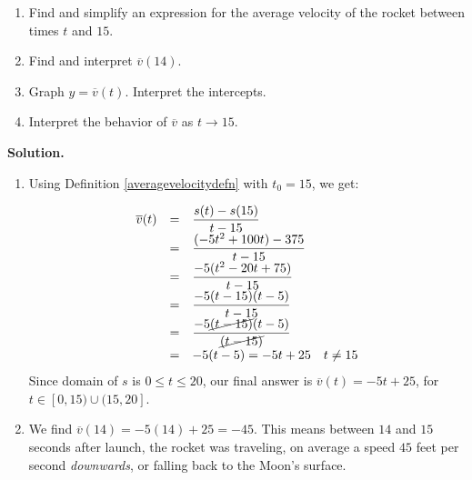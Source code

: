 \begin{ex}
\begin{ex}
\begin{enumerate}

\item  Find and simplify an expression for the average velocity of the rocket between times $t$ and $15$.

\item Find and interpret $\overline{v}(14)$.

\item  Graph $y = \overline{v}(t)$. Interpret the intercepts.

\item Interpret the behavior of $\overline{v}$ as $t \rightarrow 15$.

\end{enumerate}

{\bf Solution.}

\begin{enumerate}

\item Using Definition \ref{averagevelocitydefn} with $t_{0} = 15$, we get: 

\[ \begin{array}{rclr}

 \overline{v}(t) & = & \dfrac{s(t) - s(15)}{t-15} \\
                       & =  & \dfrac{(-5t^2+100t) - 375}{t - 15}  \\
                        & =  & \dfrac{-5(t^2-20t+75)}{t - 15}  \\
                        & = & \dfrac{-5(t-15)(t-5)}{t-15}  \\
                        & = &  \dfrac{-5\cancel{(t-15)} (t-5)}{\cancel{(t-15)}} \\
                         & = & -5(t-5) = -5t + 25 & \text{$t \neq 15$} \end{array} \]
Since  domain of $s$ is  $0 \leq t \leq 20$, our final answer is $\overline{v}(t) = -5t+25$,  for $t \in [0, 15) \cup (15, 20]$. 

\item  We find $\overline{v}(14) = -5(14)+25 = -45$.  This means between  $14$ and $15$ seconds after launch, the rocket was traveling, on average  a speed $45$ feet per second \textit{downwards}, or falling back to the Moon's surface.


\end{enumerate}
\end{ex}
\end{ex}
